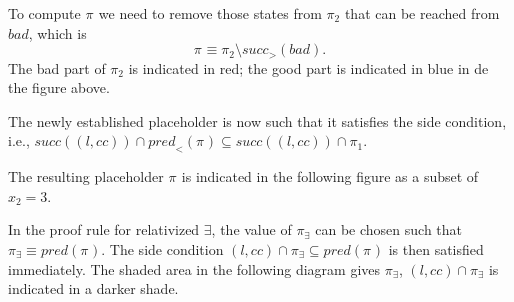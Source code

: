 \documentclass{article}
\newcommand{\placeholder}[1][]{\pi_{#1}}
\newcommand{\loc}{l}
\newcommand{\region}{\mathit{cc}}
\newcommand{\suc}{\mathit{succ}}
\newcommand{\pre}{\mathit{pred}}
\begin{document}
To compute $\placeholder$ we need to remove those states from $\placeholder[2]$ that can be reached from $\mathit{bad}$, which is
\begin{equation}
  \placeholder \equiv \placeholder[2] \setminus \suc_{>}(\mathit{bad}).
\end{equation}
The bad part of $\placeholder[2]$
is indicated in red; the good part is indicated in blue in de the figure above.

The newly established placeholder is now such that it satisfies the side
condition, i.e., $\suc((\loc, \region)) \cap \pre_<(\placeholder) \subseteq \suc((\loc, \region)) \cap \placeholder[1]$.

The resulting placeholder $\placeholder$ is indicated in the
following figure as a subset of $x_2 = 3$.

In the proof rule for relativized $\exists$, the value of $\placeholder[\exists]$
can be chosen such that $\placeholder[\exists] \equiv \pre(\placeholder)$. The
side condition $(\loc, \region) \cap \placeholder[\exists] \subseteq \pre(\placeholder)$
is then satisfied immediately. The shaded area in the following diagram gives
$\placeholder[\exists]$, $(\loc, \region) \cap \placeholder[\exists]$ is indicated
in a darker shade.
\end{document}
